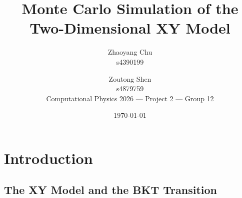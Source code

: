 \documentclass[11pt,a4paper]{article}
\title{Monte Carlo Simulation of the Two-Dimensional XY Model}
\author{Zhaoyang Chu \\ s4390199
        \and
        Zoutong Shen \\ s4879759 \\[6pt]
        Computational Physics 2026 --- Project 2 --- Group 12}
\date{\today}
\begin{document}
\maketitle

\begin{abstract}
\end{abstract}

\section{Introduction}
\label{sec:introduction}


\subsection{The XY Model and the BKT Transition}
\label{sec:xy_model}

\end{document}
